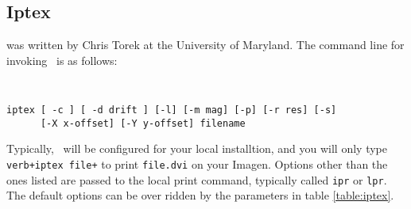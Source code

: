 \subsection{Iptex}
\iptex was written by Chris Torek at the University of Maryland.
The command line for invoking \iptex\ is as follows:\\
{\tt
\begin{verbatim}
iptex [ -c ] [ -d drift ] [-l] [-m mag] [-p] [-r res] [-s]
      [-X x-offset] [-Y y-offset] filename
\end{verbatim}
}

Typically, \iptex\ will be configured for your local installtion,
and you will only type {\tt verb+iptex file+} to print {\tt file.dvi}
on your Imagen.
Options other than the ones listed are passed to the local print
command, typically called {\tt ipr} or {\tt lpr}.
The default options can be over ridden by the parameters
in table \ref{table:iptex}.

